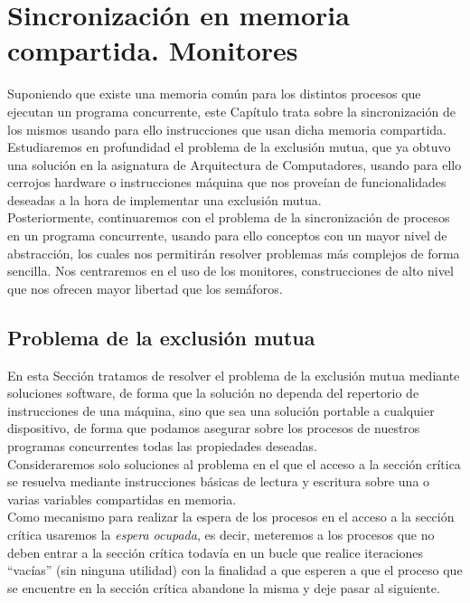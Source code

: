 \chapter{Sincronización en memoria compartida. Monitores}
Suponiendo que existe una memoria común para los distintos procesos que ejecutan un programa concurrente, este Capítulo trata sobre la sincronización de los mismos usando para ello instrucciones que usan dicha memoria compartida.\\

Estudiaremos en profundidad el problema de la exclusión mutua, que ya obtuvo una solución en la asignatura de Arquitectura de Computadores, usando para ello cerrojos hardware o instrucciones máquina que nos proveían de funcionalidades deseadas a la hora de implementar una exclusión mutua.\\

Posteriormente, continuaremos con el problema de la sincronización de procesos en un programa concurrente, usando para ello conceptos con un mayor nivel de abstracción, los cuales nos permitirán resolver problemas más complejos de forma sencilla. Nos centraremos en el uso de los monitores, construcciones de alto nivel que nos ofrecen mayor libertad que los semáforos.\\

\section{Problema de la exclusión mutua}
En esta Sección tratamos de resolver el problema de la exclusión mutua mediante soluciones software, de forma que la solución no dependa del repertorio de instrucciones de una máquina, sino que sea una solución portable a cualquier dispositivo, de forma que podamos asegurar sobre los procesos de nuestros programas concurrentes todas las propiedades deseadas.\\

Consideraremos solo soluciones al problema en el que el acceso a la sección crítica se resuelva mediante instrucciones básicas de lectura y escritura sobre una o varias variables compartidas en memoria.\\

Como mecanismo para realizar la espera de los procesos en el acceso a la sección crítica usaremos la \textit{espera ocupada}, es decir, meteremos a los procesos que no deben entrar a la sección crítica todavía en un bucle que realice iteraciones ``vacías'' (sin ninguna utilidad) con la finalidad a que esperen a que el proceso que se encuentre en la sección crítica abandone la misma y deje pasar al siguiente.

